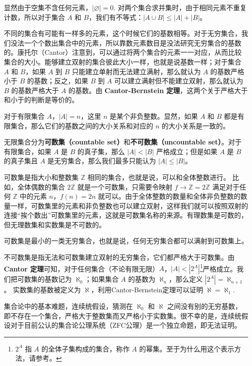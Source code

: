 

显然由于空集不含任何元素，$|\varnothing|=0$. 对两个集合求并集时，由于相同元素不重复计数，所以对于集合 $A$ 和 $B$，我们有不等式：$|A\cup B|\leqslant|A|+|B|$。

不同的集合有可能有一样多的元素，这个时候它们的基数相等。对于无穷集合，我们没法一个个数出集合中的元素，所以靠数元素数目是没法研究无穷集合的基数的。康托尔（Cantor）注意到，可以通过将两个集合的元素一一对应，从而比较集合的大小。能够建立双射的集合彼此大小一样，也就是说基数一样；对于集合 $A$ 和 $B$，如果 $A$ 到 $B$ 只能建立单射而无法建立满射，那么就认为 $A$ 的基数严格小于 $B$ 的基数；反之，如果 $B$ 到 $A$ 可以建立满射但不能建立双射，那么就认为 $B$ 的基数严格大于 $A$ 的基数。由 \textbf{Cantor-Bernstein 定理}，这两个关于严格大于和小于的判断是等价的。

对于有限集合 $A$，$|A|=n$，这里 $n$ 是某个非负整数。显然，如果 $A$ 和 $B$ 都是有限集合，那么它们的基数之间的大小关系和对应的 $n$ 的大小关系是一致的。

无限集合分为\textbf{可数集（countable set）}和\textbf{不可数集（uncountable set）}。对于有限集合，如果 $A$ 是 $B$ 的真子集，那么 $|A|<|B|$ 严格成立；但是如果 $A$ 是 $B$ 的真子集且 $A$ 是无穷集合，那么我们最多只能认为 $|A|\leqslant|B|$。

可数集是指大小和整数集 $\mathbb{Z}$ 相同的集合，也就是说，可以和全体整数进行。 比如，全体偶数的集合 $2\mathbb{Z}$ 就是一个可数集，只需要令映射 $f\rightarrow \mathbb{Z}=2\mathbb{Z}$ 满足对于任何 $\mathbb{Z}$ 中的元素 $n$，$f(n)=2n$ 就可以。由于全体整数的数量和全体非负整数的数量一样，可数集里的元素和非负整数也可以建立双射，这样我们就可以按照双射的连接“挨个数出”可数集里的元素，这就是可数集名称的来源。有理数集是可数的，但无理数集和实数集是不可数的。

可数集是最小的一类无穷集合，也就是说，任何无穷集合都可以满射到可数集上。

不可数集是指无法和可数集建立双射的无穷集合，它们都严格大于可数集。由 \textbf{Cantor 定理}可知，对于任何集合（不论有限无限）$A$，$|A|<|2^A|$\footnote{$2^A$ 指 $A$ 的全体子集构成的集合，称作 $A$ 的幂集。至于为什么用这个表示方法，请参考。}严格成立。我们把可数集的基数记为 $\aleph_0$；如果集合 $A$ 的基数为 $\aleph_n$，那么定义 $|2^A|=\aleph_{n+1}$。 实数集的基数被定义为 $\aleph$，利用Cantor-Bernstein定理可以证明 $\aleph=\aleph_1$. 

集合论中的基本难题，连续统假设，猜测在 $\aleph_0$ 和 $\aleph$ 之间没有别的无穷基数，即不存在一个集合，严格大于整数集而又严格小于实数集。很不幸的是，连续统假设对于目前公认的集合论公理系统（ZFC公理）是一个独立命题，即无法证明。

